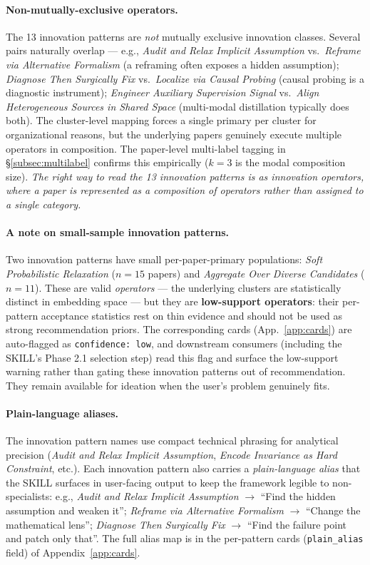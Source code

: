 \documentclass[10pt,a4paper]{article}
\begin{document}
\paragraph{Non-mutually-exclusive operators.} The 13 innovation patterns are \emph{not} mutually exclusive innovation classes. Several pairs naturally overlap --- e.g., \emph{Audit and Relax Implicit Assumption} vs.\ \emph{Reframe via Alternative Formalism} (a reframing often exposes a hidden assumption); \emph{Diagnose Then Surgically Fix} vs.\ \emph{Localize via Causal Probing} (causal probing is a diagnostic instrument); \emph{Engineer Auxiliary Supervision Signal} vs.\ \emph{Align Heterogeneous Sources in Shared Space} (multi-modal distillation typically does both). The cluster-level mapping forces a single primary per cluster for organizational reasons, but the underlying papers genuinely execute multiple operators in composition. The paper-level multi-label tagging in \S\ref{subsec:multilabel} confirms this empirically (\(k{=}3\) is the modal composition size). \emph{The right way to read the 13 innovation patterns is as innovation operators, where a paper is represented as a composition of operators rather than assigned to a single category.}

\paragraph{A note on small-sample innovation patterns.} Two innovation patterns have small per-paper-primary populations: \emph{Soft Probabilistic Relaxation} ($n{=}15$ papers) and \emph{Aggregate Over Diverse Candidates} ($n{=}11$). These are valid \emph{operators} --- the underlying clusters are statistically distinct in embedding space --- but they are \textbf{low-support operators}: their per-pattern acceptance statistics rest on thin evidence and should not be used as strong recommendation priors. The corresponding cards (App.~\ref{app:cards}) are auto-flagged as \texttt{confidence: low}, and downstream consumers (including the SKILL's Phase 2.1 selection step) read this flag and surface the low-support warning rather than gating these innovation patterns out of recommendation. They remain available for ideation when the user's problem genuinely fits.

\paragraph{Plain-language aliases.} The innovation pattern names use compact technical phrasing for analytical precision (\emph{Audit and Relax Implicit Assumption}, \emph{Encode Invariance as Hard Constraint}, etc.). Each innovation pattern also carries a \emph{plain-language alias} that the SKILL surfaces in user-facing output to keep the framework legible to non-specialists: e.g., \emph{Audit and Relax Implicit Assumption} $\to$ ``Find the hidden assumption and weaken it''; \emph{Reframe via Alternative Formalism} $\to$ ``Change the mathematical lens''; \emph{Diagnose Then Surgically Fix} $\to$ ``Find the failure point and patch only that''. The full alias map is in the per-pattern cards (\texttt{plain\_alias} field) of Appendix~\ref{app:cards}.
\end{document}
